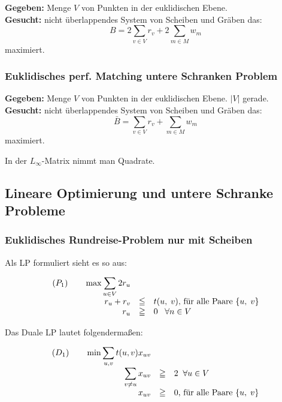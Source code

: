 {\bf Gegeben:} Menge $V$ von Punkten in der euklidischen Ebene.\\
{\bf Gesucht:} nicht überlappendes System von Scheiben und Gräben das:
\[B=2 \sum_{v\in V} r_{v} + 2 \sum_{m\in M} w_{m}\]
maximiert.

\subsubsection{Euklidisches perf. Matching untere Schranken Problem}

{\bf Gegeben:} Menge $V$ von Punkten in der euklidischen Ebene. $|V|$
gerade.\\
{\bf Gesucht:} nicht überlappendes System von Scheiben und Gräben das:
\[\bar{B}= \sum_{v\in V} r_{v} + \sum_{m\in M} w_{m}\]
maximiert.
 
In der $L_{\infty}$-Matrix nimmt man Quadrate.

\subsection{Lineare Optimierung und untere Schranke Probleme}

\subsubsection{Euklidisches Rundreise-Problem nur mit Scheiben}

Als LP formuliert sieht es so aus:

\[\begin{array}{rcl}
(P_{1}) \hspace{7mm}  \max \displaystyle \sum_{u \in V} 2r_{u}\\
r_{u} + r_{v} &\leqq& t(u,\; v) \mbox{, für alle Paare }\{u,\; v\}\\
r_{u} &\geqq&0 \; \; \; \forall n\in V
\end{array}
\]

Das Duale LP lautet folgendermaßen:

\[\begin{array}{rcl}
(D_{1}) \hspace{7mm} \min \displaystyle \sum_{u,v} t(u,v) x_{u v}\\
\displaystyle \sum_{v\not= u} x_{u v} &\geqq & 2 \; \; \forall u \in V\\
x_{u v} &\geqq & 0 \mbox{, für alle Paare } \{u,\; v\} 
\end{array}\]

